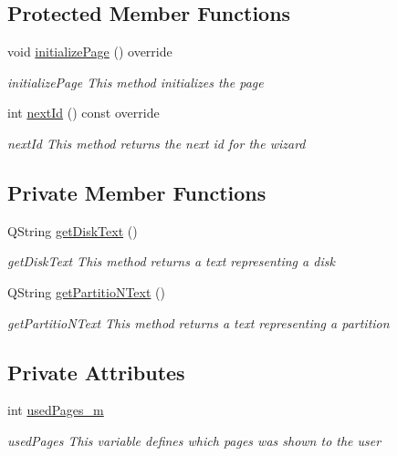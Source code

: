 \subsection*{Protected Member Functions}
\begin{DoxyCompactItemize}
\item 
void \mbox{\hyperlink{classui_1_1wizard_1_1pages_1_1_summary_page_a987e9e51fef71237349acb3b47818737}{initialize\+Page}} () override
\begin{DoxyCompactList}\small\item\em initialize\+Page This method initializes the page \end{DoxyCompactList}\item 
int \mbox{\hyperlink{classui_1_1wizard_1_1pages_1_1_summary_page_a343463680aad6cf8357c9f13fe23e57d}{next\+Id}} () const override
\begin{DoxyCompactList}\small\item\em next\+Id This method returns the next id for the wizard \end{DoxyCompactList}\end{DoxyCompactItemize}
\subsection*{Private Member Functions}
\begin{DoxyCompactItemize}
\item 
Q\+String \mbox{\hyperlink{classui_1_1wizard_1_1pages_1_1_summary_page_af31d12dc5ed2c917c8f65fe7790b661f}{get\+Disk\+Text}} ()
\begin{DoxyCompactList}\small\item\em get\+Disk\+Text This method returns a text representing a disk \end{DoxyCompactList}\item 
Q\+String \mbox{\hyperlink{classui_1_1wizard_1_1pages_1_1_summary_page_a0100c8e2a029708c5447c20c83bd7257}{get\+Partitio\+N\+Text}} ()
\begin{DoxyCompactList}\small\item\em get\+Partitio\+N\+Text This method returns a text representing a partition \end{DoxyCompactList}\end{DoxyCompactItemize}
\subsection*{Private Attributes}
\begin{DoxyCompactItemize}
\item 
int \mbox{\hyperlink{classui_1_1wizard_1_1pages_1_1_summary_page_a8e0bd026c5d978fbb1bf157439867fd5}{used\+Pages\+\_\+m}}
\begin{DoxyCompactList}\small\item\em used\+Pages This variable defines which pages was shown to the user \end{DoxyCompactList}\end{DoxyCompactItemize}


